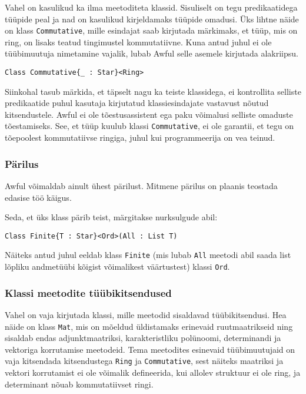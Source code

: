 \documentclass[12pt]{article}
\begin{document}
      Vahel on kasulikud ka ilma meetoditeta klassid. Sisuliselt on tegu predikaatidega tüüpide peal ja nad on kasulikud kirjeldamaks tüüpide omadusi. Üks lihtne näide on klass \verb!Commutative!, mille esindajat saab kirjutada märkimaks, et tüüp, mis on ring, on lisaks teatud tingimustel kommutatiivne. Kuna antud juhul ei ole tüübimuutuja nimetamine vajalik, lubab Awful selle asemele kirjutada alakriipsu.

      \begin{verbatim}Class Commutative{_ : Star}<Ring>\end{verbatim}

      Siinkohal tasub märkida, et täpselt nagu ka teiste klassidega, ei kontrollita selliste predikaatide puhul kasutaja kirjutatud klassiesindajate vastavust nõutud kitsendustele. Awful ei ole tõestusassistent ega paku võimalusi selliste omaduste tõestamiseks. See, et tüüp kuulub klassi \verb!Commutative!, ei ole garantii, et tegu on tõepoolest kommutatiivse ringiga, juhul kui programmeerija on vea teinud.
      \subsubsection{Pärilus}
        Awful võimaldab ainult ühest pärilust. Mitmene pärilus on plaanis teostada edasise töö käigus.

        Seda, et üks klass pärib teist, märgitakse nurksulgude abil:

        \begin{verbatim}Class Finite{T : Star}<Ord>(All : List T)\end{verbatim}

        Näiteks antud juhul eeldab klass \verb!Finite! (mis lubab \verb!All! meetodi abil saada list lõpliku andmetüübi kõigist võimalikest väärtustest) klassi \verb!Ord!.
      \subsubsection{Klassi meetodite tüübikitsendused}
        Vahel on vaja kirjutada klassi, mille meetodid sisaldavad tüübikitsendusi. Hea näide on klass \verb!Mat!, mis on mõeldud üldistamaks erinevaid ruutmaatrikseid ning sisaldab endas adjunktmaatriksi, karakteristliku polünoomi, determinandi ja vektoriga korrutamise meetodeid. Tema meetodites esinevaid tüübimuutujaid on vaja kitsendada kitsendustega \verb!Ring! ja \verb!Commutative!, sest näiteks maatriksi ja vektori korrutamist ei ole võimalik defineerida, kui allolev struktuur ei ole ring, ja determinant nõuab kommutatiivset ringi.
\end{document}
